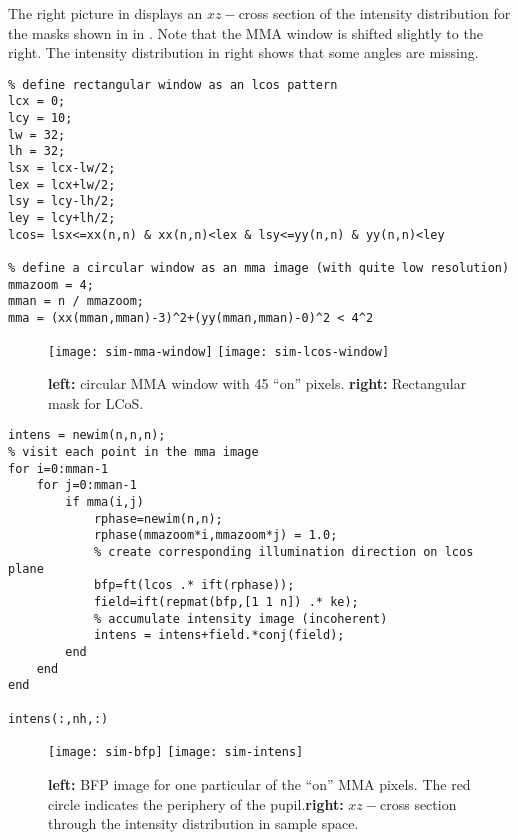 {The right picture in  displays an
$xz-$cross section of the intensity distribution for the masks shown
in in . Note that the MMA window is
shifted slightly to the right. The intensity distribution in
 right shows that some angles are missing.

\begin{verbatim}
% define rectangular window as an lcos pattern
lcx = 0;
lcy = 10;
lw = 32;
lh = 32;
lsx = lcx-lw/2;
lex = lcx+lw/2;
lsy = lcy-lh/2;
ley = lcy+lh/2;
lcos= lsx<=xx(n,n) & xx(n,n)<lex & lsy<=yy(n,n) & yy(n,n)<ley

% define a circular window as an mma image (with quite low resolution)
mmazoom = 4;
mman = n / mmazoom;
mma = (xx(mman,mman)-3)^2+(yy(mman,mman)-0)^2 < 4^2
\end{verbatim}

\begin{figure}[!hbt]
  \centering
  \texttt{[image: sim-mma-window]}
  \quad\quad
  \texttt{[image: sim-lcos-window]}
  \caption{{\bf left:} circular MMA window with 45 ``on'' pixels. {\bf
      right:} Rectangular mask for LCoS.}
  \label{fig:mma-lcos-window}
\end{figure}


\begin{verbatim}
intens = newim(n,n,n);
% visit each point in the mma image
for i=0:mman-1
    for j=0:mman-1
        if mma(i,j)
            rphase=newim(n,n);
            rphase(mmazoom*i,mmazoom*j) = 1.0;
            % create corresponding illumination direction on lcos plane
            bfp=ft(lcos .* ift(rphase));
            field=ift(repmat(bfp,[1 1 n]) .* ke);
            % accumulate intensity image (incoherent)
            intens = intens+field.*conj(field);
        end
    end
end

intens(:,nh,:)
\end{verbatim}}
\begin{figure}[!hbt]
  \centering
  \texttt{[image: sim-bfp]}
  \quad\quad
  \texttt{[image: sim-intens]}
  \caption{{\bf left:} BFP image for one particular of the ``on'' MMA
    pixels. The red circle indicates the periphery of the pupil.{\bf right:} $xz-$cross section through the intensity
    distribution in sample space.}
  \label{fig:sim-bfp-intens}
\end{figure}
